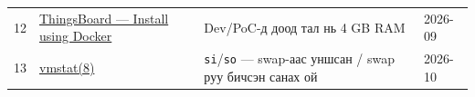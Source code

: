\begin{longtable}[]{@{}llll@{}}
\begin{minipage}[t]{0.22\columnwidth}\raggedright
12\strut
\end{minipage} & \begin{minipage}[t]{0.22\columnwidth}\raggedright
\href{https://thingsboard.io/docs/installation/docker/}{ThingsBoard --- Install using Docker}\strut
\end{minipage} & \begin{minipage}[t]{0.22\columnwidth}\raggedright
Dev/PoC-д доод тал нь 4 GB RAM\strut
\end{minipage} & \begin{minipage}[t]{0.22\columnwidth}\raggedright
2026-09\strut
\end{minipage}\tabularnewline
\begin{minipage}[t]{0.22\columnwidth}\raggedright
13\strut
\end{minipage} & \begin{minipage}[t]{0.22\columnwidth}\raggedright
\href{https://man7.org/linux/man-pages/man8/vmstat.8.html}{vmstat(8)}\strut
\end{minipage} & \begin{minipage}[t]{0.22\columnwidth}\raggedright
\texttt{si}/\allowbreak\texttt{so} --- swap-аас уншсан / swap руу бичсэн санах ой\strut
\end{minipage} & \begin{minipage}[t]{0.22\columnwidth}\raggedright
2026-10\strut
\end{minipage}\tabularnewline
\bottomrule
\end{longtable}\endgroup
